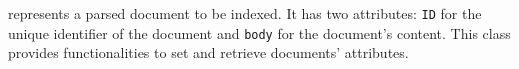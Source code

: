 represents a parsed document to be indexed.  It has two attributes: \texttt{ID} for the unique identifier of the document and \texttt{body} for the document's content. This class provides functionalities to set and retrieve documents' attributes.